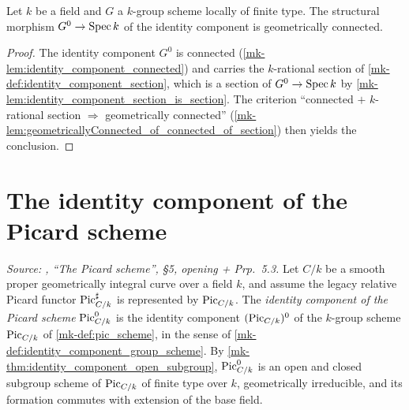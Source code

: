 \begin{lemma}\label{mk-lem:identity_component_geometrically_connected}
  \leanok

  Let \(k\) be a field and \(G\) a \(k\)-group scheme locally of finite
  type. The structural morphism \(G^0 \to \operatorname{Spec} k\) of the identity
  component is geometrically connected.
\end{lemma}
\begin{proof}
  \leanok
  The identity component \(G^0\) is connected
  (\ref{mk-lem:identity_component_connected}) and carries the \(k\)-rational
  section of \ref{mk-def:identity_component_section}, which is a section of
  \(G^0 \to \operatorname{Spec} k\) by \ref{mk-lem:identity_component_section_is_section}.
  The criterion ``connected \(+\) \(k\)-rational section \(\Rightarrow\)
  geometrically connected''
  (\ref{mk-lem:geometricallyConnected_of_connected_of_section}) then yields
  the conclusion.
\end{proof}

\section{The identity component of the Picard scheme}
\label{mk-sec:pic0_definition}


\begin{definition}\label{mk-def:pic_zero_subscheme}
  \leanok

  \textit{Source: \cite{kleiman-picard}, ``The Picard scheme'', \S 5, opening +
  Prp.~5.3.}
  Let \(C/k\) be a smooth proper geometrically integral curve over a field
  \(k\), and assume the legacy relative Picard functor
  \(\operatorname{Pic}^\sharp_{C/k}\) is represented by \(\operatorname{Pic}_{C/k}\). The
  \emph{identity component of the Picard scheme}
  \(\operatorname{Pic}^0_{C/k}\) is the identity component
  \((\operatorname{Pic}_{C/k})^0\) of the \(k\)-group scheme \(\operatorname{Pic}_{C/k}\) of
  \ref{mk-def:pic_scheme}, in the sense of
  \ref{mk-def:identity_component_group_scheme}. By
  \ref{mk-thm:identity_component_open_subgroup}, \(\operatorname{Pic}^0_{C/k}\) is an open
  and closed subgroup scheme of \(\operatorname{Pic}_{C/k}\) of finite type over \(k\),
  geometrically irreducible, and its formation commutes with
  extension of the base field.
\end{definition}


